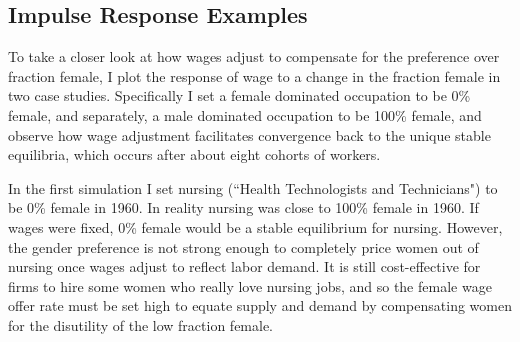 \documentclass[12pt]{article}
\begin{document}

	



\subsection{Impulse Response Examples}
To take a closer look at how wages adjust to compensate for the preference over fraction female, I plot the response of wage to a change in the fraction female in two case studies. Specifically I set a female dominated occupation to be 0\% female, and separately, a male dominated occupation to be 100\% female, and observe how wage adjustment facilitates convergence back to the unique stable equilibria, which occurs after about eight cohorts of workers.




In the first simulation I set nursing (``Health Technologists and Technicians") to be 0\% female in 1960. In reality nursing was close to 100\% female in 1960. If wages were fixed, 0\% female would be a stable equilibrium for nursing. However, the gender preference is not strong enough to completely price women out of nursing once wages adjust to reflect labor demand. It is still cost-effective for firms to hire some women who really love nursing jobs, and so the female wage offer rate must be set high to equate supply and demand by compensating women for the disutility of the low fraction female.

\end{document}
